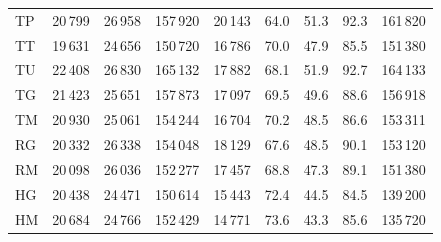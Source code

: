 \begin{minipage}{\textwidth}
\begin{tabular*}{\textwidth}{@{\extracolsep{\fill}}lrrrrrrrr@{}}
TP & 20\,799 & 26\,958 & 157\,920 & 20\,143 & 64.0 & 51.3 & 92.3 & 161\,820\\
TT & 19\,631 & 24\,656 & 150\,720 & 16\,786 & 70.0 & 47.9 & 85.5 & 151\,380\\
TU & 22\,408 & 26\,830 & 165\,132 & 17\,882 & 68.1 & 51.9 & 92.7 & 164\,133\\
TG & 21\,423 & 25\,651 & 157\,873 & 17\,097 & 69.5 & 49.6 & 88.6 & 156\,918\\
TM & 20\,930 & 25\,061 & 154\,244 & 16\,704 & 70.2 & 48.5 & 86.6 & 153\,311\\
RG & 20\,332 & 26\,338 & 154\,048 & 18\,129 & 67.6 & 48.5 & 90.1 & 153\,120\\
RM & 20\,098 & 26\,036 & 152\,277 & 17\,457 & 68.8 & 47.3 & 89.1 & 151\,380\\
HG & 20\,438 & 24\,471 & 150\,614 & 15\,443 & 72.4 & 44.5 & 84.5 & 139\,200\\
HM & 20\,684 & 24\,766 & 152\,429 & 14\,771 & 73.6 & 43.3 & 85.6 & 135\,720\\
\bottomrule\end{tabular*}
\end{minipage}\par\medskip
